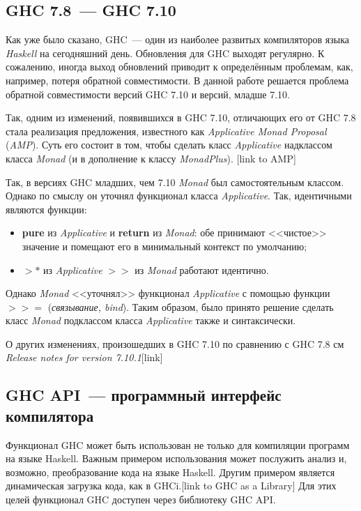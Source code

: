 \subsection{GHC 7.8~--- GHC 7.10}
Как уже было сказано, GHC~--- один из наиболее развитых компиляторов языка \textit{Haskell} на сегодняшний день. Обновления для GHC выходят регулярно. К сожалению, иногда выход обновлений приводит к определённым проблемам, как, например, потеря обратной совместимости. В данной работе решается проблема обратной совместимости версий GHC 7.10 и версий, младше 7.10.

Так, одним из изменений, появившихся в GHC 7.10, отличающих его от GHC 7.8 стала реализация предложения, известного как \textit{Applicative Monad Proposal} (\textit{AMP}). Суть его состоит в том, чтобы сделать класс \textit{Applicative} надклассом класса \textit{Monad} (и в дополнение к классу \textit{MonadPlus}). [link to AMP] 

Так, в версиях GHC младших, чем 7.10 \textit{Monad} был самостоятельным классом. Однако по смыслу он уточнял функционал класса \textit{Applicative}. Так, идентичными являются функции:
\begin{itemize}
\item \textbf{pure} из \textit{Applicative} и \textbf{return} из \textit{Monad}: обе принимают <<чистое>> значение и помещают его в минимальный контекст по умолчанию;
\item \textbf{$>*$} из \textit{Applicative} \textbf{$>>$} из \textit{Monad} работают идентично.
\end{itemize}
Однако \textit{Monad} <<уточнял>> функционал \textit{Applicative} с помощью функции \textbf{$>>=$} (\textit{связывание, bind}). Таким образом, было принято решение сделать класс \textit{Monad} подклассом класса \textit{Applicative} также и синтаксически.

О других изменениях, произошедших в GHC 7.10 по сравнению с GHC 7.8 см \textit{Release notes for version 7.10.1}[link]


\subsection{GHC API~--- программный интерфейс компилятора}
Функционал GHC может быть использован не только для компиляции программ на языке Haskell. Важным примером использования может послужить анализ и, возможно, преобразование кода на языке Haskell. Другим примером является динамическая загрузка кода, как в GHCi.[link to GHC as a Library] Для этих целей функционал GHC доступен через библиотеку GHC API.

